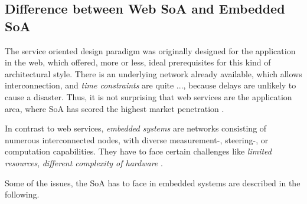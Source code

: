 \subsection{Difference between Web SoA and Embedded SoA}

The service oriented design paradigm was originally designed for the application in the web, which offered, more or less, ideal prerequisites for this kind of architectural style. There is an underlying network already available, which allows interconnection, and \emph{time constraints} are quite ..., because delays are unlikely to cause a disaster. Thus, it is not surprising that web services are the application area, where SoA has scored the highest market penetration \cite{rodrigues2011} \cite{buckl}.


In contrast to web services, \emph{embedded systems} are networks consisting of numerous interconnected nodes, with diverse measurement-, steering-, or computation capabilities. They have to face certain challenges like \emph{limited resources}, \emph{different complexity of hardware} \cite{scholz} \cite{sommer}. 

Some of the issues, the SoA has to face in embedded systems are described in the following.


